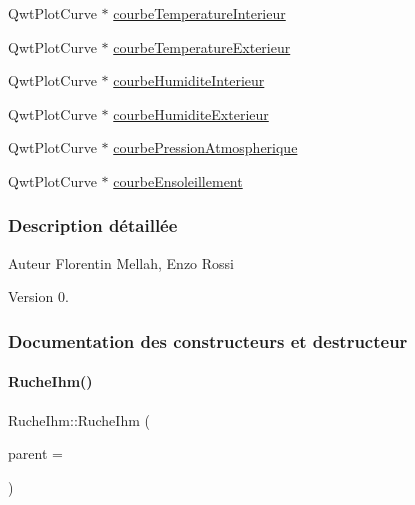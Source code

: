 \begin{DoxyCompactItemize}
Qwt\+Plot\+Curve $\ast$ \hyperlink{class_ruche_ihm_a6ce372c8df13bb78c09705432dcfcf58}{courbe\+Temperature\+Interieur}
\item 
Qwt\+Plot\+Curve $\ast$ \hyperlink{class_ruche_ihm_a68e72873a859840d3c91b147b8559118}{courbe\+Temperature\+Exterieur}
\item 
Qwt\+Plot\+Curve $\ast$ \hyperlink{class_ruche_ihm_a19a58f5841dc91eb7f84acd419f35678}{courbe\+Humidite\+Interieur}
\item 
Qwt\+Plot\+Curve $\ast$ \hyperlink{class_ruche_ihm_a0c9d769a392e3c1332f8908cd9d558eb}{courbe\+Humidite\+Exterieur}
\item 
Qwt\+Plot\+Curve $\ast$ \hyperlink{class_ruche_ihm_aa6685f1fc20aa4459eab3b0bb3c4d1ef}{courbe\+Pression\+Atmospherique}
\item 
Qwt\+Plot\+Curve $\ast$ \hyperlink{class_ruche_ihm_af160181f408b3a9519b97e67c810a0fd}{courbe\+Ensoleillement}
\end{DoxyCompactItemize}


\subsubsection{Description détaillée}
\begin{DoxyAuthor}{Auteur}
Florentin Mellah, Enzo Rossi
\end{DoxyAuthor}
\begin{DoxyVersion}{Version}
0. 
\end{DoxyVersion}


\subsubsection{Documentation des constructeurs et destructeur}
\mbox{\label{class_ruche_ihm_a04c2544ba4e9cca6c38f553c32d63dee}} 
\paragraph{\texorpdfstring{Ruche\+Ihm()}{RucheIhm()}}
{\footnotesize\ttfamily Ruche\+Ihm\+::\+Ruche\+Ihm (\begin{DoxyParamCaption}\item[{\hyperlink{class_q_widget}{Q\+Widget} $\ast$}]{parent = {} }\end{DoxyParamCaption})\hspace{0.3cm}{\ttfamily [explicit]}}


